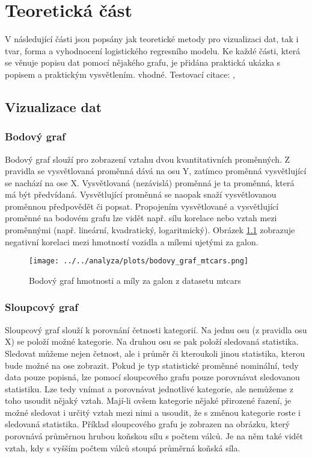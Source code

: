 \chapter{Teoretická část}
V následující části jsou popsány jak teoretické metody pro vizualizaci dat, tak i tvar, forma a vyhodnocení logistického regresního modelu. 
Ke každé části, která se věnuje popisu dat pomocí nějakého grafu, je přidána praktická ukázka s popisem a praktickým vysvětlením.
vhodné.
Testovací citace: \cite{Hebak2015}, \cite{Kleinbaum2010}

\section{Vizualizace dat}
\subsection{Bodový graf}
Bodový graf slouží pro zobrazení vztahu dvou kvantitativních proměnných. Z pravidla se vysvětlovaná proměnná dává na osu Y,
zatímco proměnná vysvětlující se nachází na ose X. Vysvětlovaná (nezávislá) proměnná je ta proměnná, která má být předvídaná.
Vysvětlující proměnná se naopak snaží vysvětlovanou proměnnou předpovědět či popsat. Propojením vysvětlované a vysvětlující proměnné
na bodovém grafu lze vidět např. sílu korelace nebo vztah mezi proměnnými (např. lineární, kvadratický, logaritmický). Obrázek \ref{fig:bodovy_graf_mtcars} zobrazuje
negativní korelaci mezi hmotností vozidla a mílemi ujetými za galon.

\begin{figure}[H]
    \centering
    \texttt{[image: ../../analyza/plots/bodovy\_graf\_mtcars.png]}
    \caption{Bodový graf hmotnosti a míly za galon z datasetu mtcars} 
    \label{fig:bodovy_graf_mtcars}
\end{figure}

\subsection{Sloupcový graf}
Sloupcový graf slouží k porovnání četnosti kategorií. Na jednu osu (z pravidla osu X) se položí možné kategorie. Na druhou osu
se pak položí sledovaná statistika.
{\color{red}
Sledovat můžeme nejen četnost, ale i průměr či kteroukoli jinou statistika, kterou bude možné na ose zobrazit.
Pokud je typ statistické proměnné nominální, tedy data pouze popisná, lze pomocí sloupcového grafu pouze porovnávat sledovanou statistiku. Lze tedy
vnímat a porovnávat jednotlivé kategorie, ale nemůžeme z toho usoudit nějaký vztah.
Mají-li ovšem kategorie nějaké přirozené řazení, je možné sledovat i určitý vztah mezi nimi a usoudit, že s změnou kategorie roste i sledovaná statistika.
Příklad sloupcového grafu je zobrazen na obrázku, který porovnává průměrnou hrubou koňskou sílu s počtem válců.
Je na něm také vidět vztah, kdy s vyšším počtem válců stoupá průměrná koňská síla.
}

